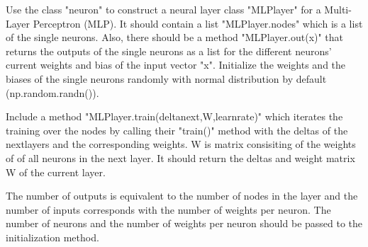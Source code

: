 \documentclass[11pt]{article}
\begin{document}
Use the class "neuron" to construct a neural layer class "MLPlayer" for
a Multi-Layer Perceptron (MLP). It should contain a list
"MLPlayer.nodes" which is a list of the single neurons. Also, there
should be a method "MLPlayer.out(x)" that returns the outputs of the
single neurons as a list for the different neurons' current weights and
bias of the input vector "x". Initialize the weights and the biases of
the single neurons randomly with normal distribution by default
(np.random.randn()).

Include a method "MLPlayer.train(deltanext,W,learnrate)" which iterates
the training over the nodes by calling their "train()" method with the
deltas of the nextlayers and the corresponding weights. W is matrix
consisiting of the weights of of all neurons in the next layer. It
should return the deltas and weight matrix W of the current layer.

The number of outputs is equivalent to the number of nodes in the layer
and the number of inputs corresponds with the number of weights per
neuron. The number of neurons and the number of weights per neuron
should be passed to the initialization method.
\end{document}
